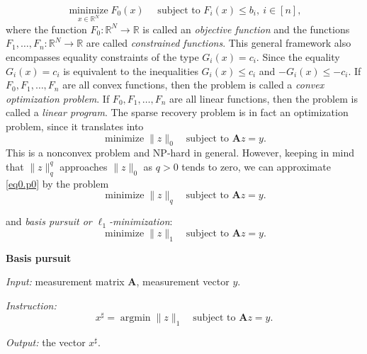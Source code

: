 \[
    \mathop{\text{minimize}}\limits_{x \in \mathbb{R}^N} F_0(x) \quad \text{ subject to } F_i(x) \leq b_i,\ i \in [n],
\]
where the function $F_0 : \mathbb{R}^N \rightarrow \mathbb{R}$ is called an \emph{\textcolor[rgb]{1,0,0}{objective function}} and the functions $F_1,\dots,F_n : \mathbb{R}^N \rightarrow \mathbb{R}$ are called \emph{\textcolor[rgb]{1,0,0}{constrained functions}}. This general framework also encompasses equality constraints of the type $G_i(x) = c_i$. Since the equality $G_i(x) = c_i$ is equivalent to the inequalities $G_i(x) \leq c_i$ and $-G_i(x) \leq -c_i$. If $F_0, F_1, \dots, F_n$ are all convex functions, then the problem is called a \emph{\textcolor[rgb]{1,0,0}{convex optimization problem}}. If $F_0, F_1, \dots, F_n$ are all linear functions, then the problem is called a \emph{\textcolor[rgb]{1,0,0}{linear program}}. The sparse recovery problem is in fact an optimization problem, since it translates into
\begin{equation}
    \mathop{\mathrm{minimize}}\|z\|_0 \quad \text{subject to } \mathbf{A}z = y. \tag{$P_0$}
    \label{eq0.p0}
\end{equation}
This is a nonconvex problem and NP-hard in general. However, keeping in mind that $\|z\|_q^q$ approaches $\|z\|_0$ as $q>0$ tends to zero, we can approximate \cref{eq0.p0} by the problem
\begin{equation}
    \mathop{\mathrm{minimize}}\|z\|_q \quad \text{subject to } \mathbf{A}z = y. \tag{$P_q$}
    \label{eq0.pq}
\end{equation}

and \emph{\textcolor[rgb]{1,0,0}{basis pursuit or $\ell_1$-minimization}}:
\begin{equation}
    \mathop{\mathrm{minimize}} \|z\|_1 \quad \text{subject to } \mathbf{A}z = y. \tag{$P_1$}
    \label{eq0.p1}
\end{equation}

\begin{mdframed}
    \label{bp}
    \begin{center}
        \textbf{\textcolor[rgb]{1,0,0}{Basis pursuit}}
    \end{center}
    \emph{Input:} measurement matrix $\mathbf{A}$, measurement vector $y$.

    \emph{Instruction:} 
    \begin{equation}
        x^{\sharp} = \mathop{\mathrm{argmin}} \|z\|_1 \quad \text{subject to } \mathbf{A}z = y. \tag{BP}
        \label{eqbp}
    \end{equation}

    \emph{Output:} the vector $x^{\sharp}$.
\end{mdframed}

